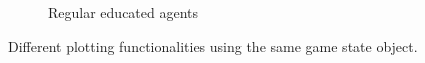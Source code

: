 \begin{figure}[ht]
\begin{subfigure}{.30\textwidth}
        \captionsetup{width=0.9\linewidth}
        \captionsetup{justification=centering}
        \caption{Regular educated agents}
    \end{subfigure}
    \captionsetup{width=0.9\linewidth}
    \captionsetup{justification=centering}
    \caption{Different plotting functionalities using the same game state object.}
    \label{fig:custom_plotting}
\end{figure}